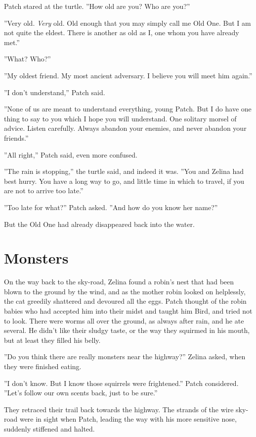 \documentclass[12pt]{book}
\begin{document}
Patch stared at the turtle. ''How old are you? Who are you?''

''Very old. {\it Very} old. Old enough that you may simply call me Old One. But I am not quite the eldest. There is another as old as I, one whom you have already met.''

''What? Who?''

''My oldest friend. My most ancient adversary. I believe you will meet him again.''

''I don't understand,'' Patch said.

''None of us are meant to understand everything, young Patch. But I do have one thing to say to you which I hope you will understand. One solitary morsel of advice. Listen carefully. Always abandon your enemies, and never abandon your friends.''

''All right,'' Patch said, even more confused.

''The rain is stopping,'' the turtle said, and indeed it was. ''You and Zelina had best hurry. You have a long way to go, and little time in which to travel, if you are not to arrive too late.''

''Too late for what?'' Patch asked. ''And how do you know her name?''

But the Old One had already disappeared back into the water.


\section{Monsters}

On the way back to the sky-road, Zelina found a robin's nest that had been blown to the ground by the wind, and as the mother robin looked on helplessly, the cat greedily shattered and devoured all the eggs. Patch thought of the robin babies who had accepted him into their midst and taught him Bird, and tried not to look. There were worms all over the ground, as always after rain, and he ate several. He didn't like their sludgy taste, or the way they squirmed in his mouth, but at least they filled his belly.

''Do you think there are really monsters near the highway?'' Zelina asked, when they were finished eating.

''I don't know. But I know those squirrels were frightened.'' Patch considered. ''Let's follow our own scents back, just to be sure.''

They retraced their trail back towards the highway. The strands of the wire sky-road were in sight when Patch, leading the way with his more sensitive nose, suddenly stiffened and halted.
\end{document}

